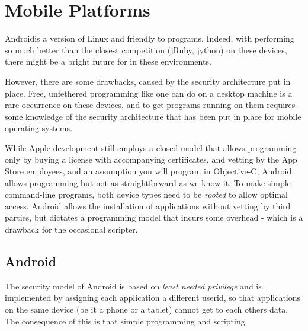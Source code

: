 {\section{Mobile Platforms}
Android\texttrademark is a version of Linux and friendly to \nr{}
programs. Indeed, with \nr{} performing so much better than the closest
competition (jRuby, jython) on these devices, there might be a bright
future for \nr{} in these environments. 

However, there are some drawbacks, caused by the security architecture
put in place. Free, unfethered programming like one can do on a
desktop machine is a rare occurrence on these devices, and to get
programs running on them requires some knowledge of the security
architecture that has been put in place for mobile operating systems.

While Apple development still employs a closed model that allows programming only by
buying a license with accompanying certificates, and vetting by the
App Store employees, and an assumption you will program in
Objective-C, Android allows programming but not as straightforward as
we know it. To make simple command-line \nr{} programs, both device
types need to be \emph{rooted} to allow optimal access. Android allows
the installation of applications without vetting by third parties, but
dictates a programming model that incurs some overhead - which is a
drawback for the occasional scripter.
\subsection{Android}
The security model of Android is based on \emph{least needed
  privilege} and is implemented by assigning each application a
different userid, so that applications on the same device (be it a
phone or a tablet) cannot get to each others data. The consequence of
this is that simple \nr{} programming and scripting 
}
